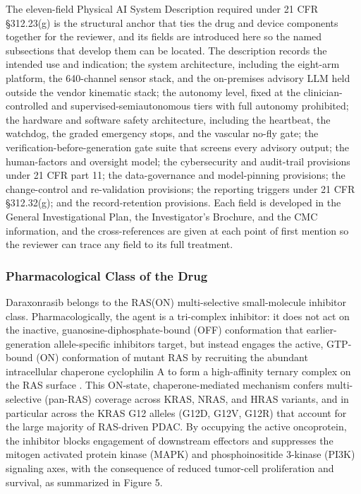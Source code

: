 The eleven-field Physical AI System Description required under 21 CFR \S 312.23(g)
is the structural anchor that ties the drug and device components together for the
reviewer, and its fields are introduced here so the named subsections that develop
them can be located. The description records the intended use and indication; the
system architecture, including the eight-arm platform, the 640-channel sensor
stack, and the on-premises advisory LLM held outside the vendor kinematic stack; the
autonomy level, fixed at the clinician-controlled and supervised-semiautonomous
tiers with full autonomy prohibited; the hardware and software safety architecture,
including the heartbeat, the watchdog, the graded emergency stops, and the vascular
no-fly gate; the verification-before-generation gate suite that screens every
advisory output; the human-factors and oversight model; the cybersecurity and
audit-trail provisions under 21 CFR part 11; the data-governance and model-pinning
provisions; the change-control and re-validation provisions; the reporting triggers
under 21 CFR \S 312.32(g); and the record-retention provisions. Each field is
developed in the General Investigational Plan, the Investigator's Brochure, and the
CMC information, and the cross-references are given at each point of first mention so
the reviewer can trace any field to its full treatment.

\subsubsection{Pharmacological Class of the Drug}

Daraxonrasib belongs to the RAS(ON) multi-selective small-molecule inhibitor class.
Pharmacologically, the agent is a tri-complex inhibitor: it does not act on the
inactive, guanosine-diphosphate-bound (OFF) conformation that earlier-generation
allele-specific inhibitors target, but instead engages the active, GTP-bound (ON)
conformation of mutant RAS by recruiting the abundant intracellular chaperone
cyclophilin A to form a high-affinity ternary complex on the RAS surface
\cite{daraxwhipple, onpremwhippl}. This ON-state, chaperone-mediated mechanism
confers multi-selective (pan-RAS) coverage across KRAS, NRAS, and HRAS variants,
and in particular across the KRAS G12 alleles (G12D, G12V, G12R) that account for
the large majority of RAS-driven PDAC. By occupying the active oncoprotein, the
inhibitor blocks engagement of downstream effectors and suppresses the mitogen
activated protein kinase (MAPK) and phosphoinositide 3-kinase (PI3K) signaling
axes, with the consequence of reduced tumor-cell proliferation and survival, as
summarized in Figure 5.

